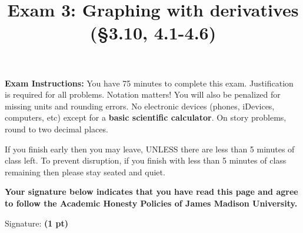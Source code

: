 \documentclass[12pt, addpoints]{exam/exam}
\title{\vspace{-8pc}
\vfill{\Huge
	\bf Exam 3: Graphing with derivatives \\ 
	(\S3.10, 4.1-4.6)} 
	}
\date{}
\newcommand{\1}{^{-1}}
\theoremstyle{plain}
\begin{document}
\begin{coverpages}
\maketitle
\thispagestyle{headandfoot}
\vspace{-4pc}
{\bf Exam Instructions:} You have 75 minutes to complete this exam.  Justification is required for all problems.  Notation matters!  You will also be penalized for missing units and rounding errors.  
No electronic devices (phones, iDevices, computers, etc) except for a \textbf{basic scientific calculator}.  On story problems, round to two decimal places. 

\vspace{1pc}
If you finish early then you may leave, UNLESS there are less than 5 minutes of class left.  To prevent disruption, if you finish with less than 5 minutes of class remaining then please stay seated and quiet.

\begin{flushright}

\vspace{0.3in}

\vspace{0.3in}
\end{flushright}

\vfill
\textbf{Your signature below indicates that you have read this page and agree to follow the Academic Honesty Policies of James Madison University.}  

\vspace{0.3in}
Signature: {\bf (1 pt)} \underline{\hspace{73ex}}

\newpage
\vspace*{\fill}
\gradetable
\end{coverpages}
\end{document}
